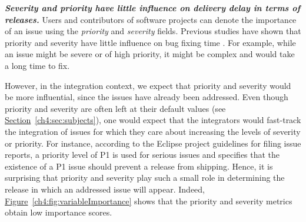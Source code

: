 \noindent\textit{\textbf{Severity and priority have little influence on
delivery delay in terms of releases.}} Users and contributors of software
projects can denote the importance of an issue using the \textit{priority} and
\textit{severity} fields. Previous studies have shown that priority and
severity have little influence on bug fixing time
\cite{tian2015unreliability,Herraiz2008,Mockus:2002}. For example, while an
issue might be severe or of high priority, it might be complex and would take a
long time to fix.  

However, in the integration context, we expect that priority and severity would
be more influential, since the issues have already been addressed. Even though
priority and severity are often left at their default values (see
\hyperref[ch4:sec:subjects]{Section}~\ref{ch4:sec:subjects}), one would expect that the
integrators would fast-track the integration of issues for which they
care about increasing the levels of severity or priority. For instance,
according to the Eclipse project guidelines for filing issue reports, a priority
level of P1 is used for serious issues and specifies that the existence of a P1
issue should prevent a release from
shipping.
Hence, it is surprising that priority and severity play such a small role in
determining the release in which an addressed issue will appear. Indeed,
\hyperref[ch4:fig:variableImportance]{Figure}~\ref{ch4:fig:variableImportance} shows
that the priority and severity metrics obtain low importance scores.

